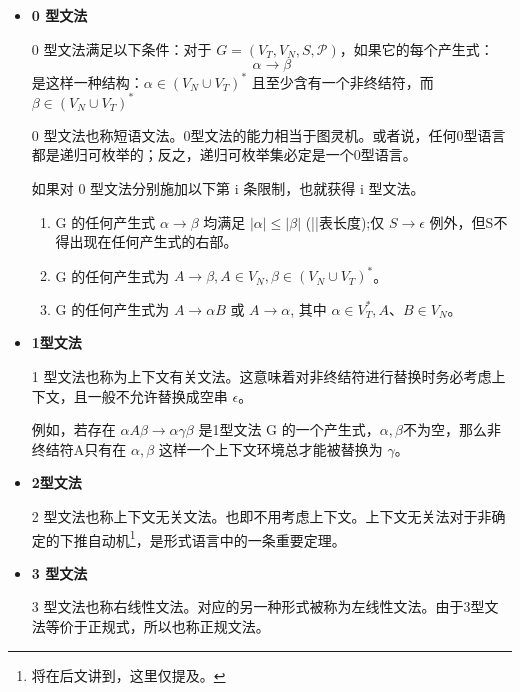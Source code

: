 \begin{itemize}
    \item \textbf{0 型文法}
    
    0 型文法满足以下条件：对于 $G=(V_T,V_N,S,\mathcal{P})$，如果它的每个产生式：
    \[\alpha \rightarrow \beta\]
    是这样一种结构：$\alpha \in (V_N \cup V_T)^*$ 且至少含有一个非终结符，而 $\beta \in (V_N \cup V_T)^*$
    
    0 型文法也称短语文法。0型文法的能力相当于图灵机。或者说，任何0型语言都是递归可枚举的；反之，递归可枚举集必定是一个0型语言。

    如果对 0 型文法分别施加以下第 i 条限制，也就获得 i 型文法。
    \begin{enumerate}
        \item G 的任何产生式 $\alpha \rightarrow \beta$ 均满足 $|\alpha| \leq |\beta|$ (||表长度);仅 $S \rightarrow \epsilon$ 例外，但S不得出现在任何产生式的右部。
        \item G 的任何产生式为 $A\rightarrow \beta,A\in V_N,\beta \in (V_N \cup V_T)^*$。
        \item G 的任何产生式为 $A\rightarrow\alpha B$ 或 $A \rightarrow \alpha$, 其中 $\alpha \in V_T^*,A、B\in V_N$。
    \end{enumerate}

    \item \textbf{1型文法}
    
    1 型文法也称为上下文有关文法。这意味着对非终结符进行替换时务必考虑上下文，且一般不允许替换成空串 $\epsilon$。

    例如，若存在 $\alpha A \beta \rightarrow \alpha \gamma \beta$ 是1型文法 G 的一个产生式，$\alpha,\beta$不为空，那么非终结符A只有在 $\alpha,\beta$ 这样一个上下文环境总才能被替换为 $\gamma$。

    \item \textbf{2型文法}
    
    2 型文法也称上下文无关文法。也即不用考虑上下文。上下文无关法对于非确定的下推自动机\footnote{将在后文讲到，这里仅提及。}，是形式语言中的一条重要定理。

    \item \textbf{3 型文法}
    
    3 型文法也称右线性文法。对应的另一种形式被称为左线性文法。由于3型文法等价于正规式，所以也称正规文法。
\end{itemize}